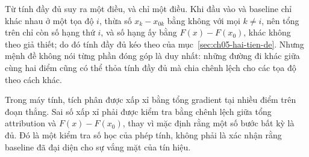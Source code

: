 Từ tính đầy đủ suy ra một điều, và chỉ một điều. Khi đầu vào và baseline chỉ
khác nhau ở một tọa độ $i$, thừa số $x_k-x_{0k}$ bằng không với mọi $k\neq i$,
nên tổng trên chỉ còn số hạng thứ $i$, và số hạng ấy bằng $F(x)-F(x_0)$, khác
không theo giả thiết; do đó tính đầy đủ kéo theo
 của mục~\ref{sec:ch05-hai-tien-de}. Nhưng mệnh đề
không nói từng phần đóng góp là duy nhất: những đường đi khác giữa cùng hai
điểm cũng có thể thỏa tính đầy đủ mà chia chênh lệch cho các tọa độ theo cách
khác.

Trong máy tính, tích phân được xấp xỉ bằng tổng gradient tại nhiều điểm trên
đoạn thẳng. Sai số xấp xỉ phải được kiểm tra bằng chênh lệch giữa tổng
attribution và $F(x)-F(x_0)$, thay vì mặc định rằng một số bước bất kỳ là đủ.
Đó là một kiểm tra số học của phép tính, không phải là xác nhận rằng baseline
đã đại diện cho sự vắng mặt của tín hiệu.

